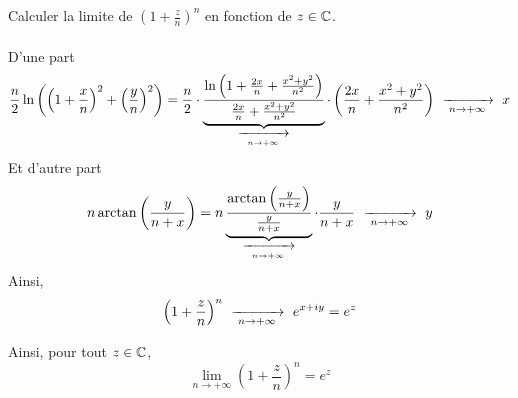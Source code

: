 \documentclass{article}
\renewenvironment{question_kholle}[2][ ]
{
	\subsection{\texorpdfstring{#2}{}}
	\notblank{#1}
	{
		\noindent #1
		\bigbreak
	}
	{}
	\begin{proof}
}
{
	\end{proof}
}
\begin{document}
\begin{question_kholle}{Calculer la limite de $\displaystyle
			\left(1+\frac{z}{n}\right)^{n}$ en fonction de $z\in\mathbb C$.}
\begin{itemize}[label=$\star$]
\begin{align*}
		      \end{align*}
		      D’une part
		      \begin{align*}
			      \frac{n}{2}\ln \left(\left(1+\frac{x}{n}\right)^{2} + \left(\frac{y}{n}\right)^{2}\right) = \frac{n}{2}\cdot \underbrace{\frac{\ln \left(1+\frac{2x}{n} + \frac{x^{2}+y^{2}}{n^{2}}\right)}{\frac{2x}{n} + \frac{x^{2}+y^{2}}{n^{2}}}}_{\ \xrightarrow[\;n \to +\infty\;]{}\ } \cdot \left(\frac{2x}{n} + \frac{x^{2}+y^{2}}{n^{2}}\right) \ \xrightarrow[\;n \to +\infty\;]{}\  x
		      \end{align*}
		      Et d’autre part
		      \[
			      n\arctan \left(\frac{y}{n+x}\right) = n \underbrace{\frac{\arctan \left(\frac{y}{n+x}\right)}{\frac{y}{n+x}}}_{\ \xrightarrow[\;n \to +\infty\;]{}\ }\cdot \frac{y}{n+x} \ \xrightarrow[\;n \to +\infty\;]{}\  y
		      \]
		      Ainsi,
		      \[
			      \left(1+\frac{z}{n}\right)^{n} \ \xrightarrow[\;n \to +\infty\;]{}\  e^{x+iy} = e^{z}
		      \]

	\end{itemize}
	Ainsi, pour tout $z\in\mathbb C$,
	\[
		\lim_{n\to+\infty} \left(1+\frac{z}{n}\right)^{n}=e^{z}
	\]

\end{question_kholle}
\end{document}
